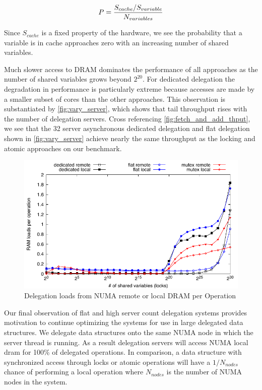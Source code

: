 \documentclass{uicthesi}
\begin{document}
\begin{equation}
P = {{S_{cache} / S_{variable}} \over N_{variables}}
\label{eq:ram}
\end{equation}

Since $S_{cache}$ is a fixed property of the hardware, we see the probability that a variable is in cache approaches zero with an increasing number of shared variables. 

Much slower access to DRAM dominates the performance of all approaches as the number of shared variables grows beyond $2^{20}$. For dedicated delegation the degradation in performance is particularly extreme because accesses are made by a smaller subset of cores than the other approaches. This observation is substantiated by \ref{fig:vary_server}, which shows that tail throughput rises with the number of delegation servers. Cross referencing \ref{fig:fetch_and_add_thput}, we see that the 32 server asynchronous dedicated delegation and flat delegation shown in \ref{fig:vary_server} achieve nearly the same throughput as the locking and atomic approaches on our benchmark. 

\begin{figure}[ht!]
\centering
\includegraphics[width=0.9\columnwidth]{FIG/ram_accesses_per_op.pdf}
\caption{Delegation loads from NUMA remote or local DRAM per Operation}
\label{fig:ram_loads}
\end{figure}

Our final observation of flat and high server count delegation systems provides motivation to continue optimizing the systems for use in large delegated data structures. We delegate data structures onto the same NUMA node in which the server thread is running. As a result delegation servers will access NUMA local dram for 100\% of delegated operations. In comparison, a data structure with synchronized access through locks or atomic operations will have a $1/N_{nodes}$ chance of performing a local operation where $N_{nodes}$ is the number of NUMA nodes in the system. 
\end{document}
